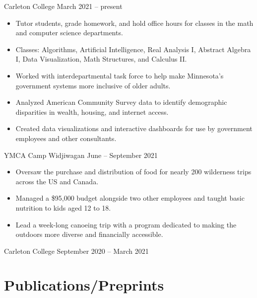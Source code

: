 \documentclass{resume}
\begin{document}
{Carleton College}
{March 2021 -- present}

\begin{itemize}
	\item Tutor students, grade homework, and hold office hours for classes in the math and computer science departments.
	\item Classes:
	      Algorithms,
	      Artificial Intelligence,
	      Real Analysis I,
	      Abstract Algebra I,
	      Data Visualization,
	      Math Structures,
	      and Calculus II.
\end{itemize}


\begin{itemize}
	\item Worked with interdepartmental task force to help make Minnesota's government systems more inclusive of older adults.
	\item Analyzed American Community Survey data to identify demographic disparities in wealth, housing, and internet access.
	\item Created data visualizations and interactive dashboards for use by government employees and other consultants.
\end{itemize}

{YMCA Camp Widjiwagan}
{June -- September 2021}

\begin{itemize}
	\item Oversaw the purchase and distribution of food for nearly 200 wilderness trips across the US and Canada.
	\item Managed a \$95,000 budget alongside two other employees and taught basic nutrition to kids aged 12 to 18.
	\item Lead a week-long canoeing trip with a program dedicated to making the outdoors more diverse and financially accessible.
\end{itemize}

{Carleton College} {September 2020 -- March 2021}



\smallskip

\section{Publications/Preprints}
\end{document}

